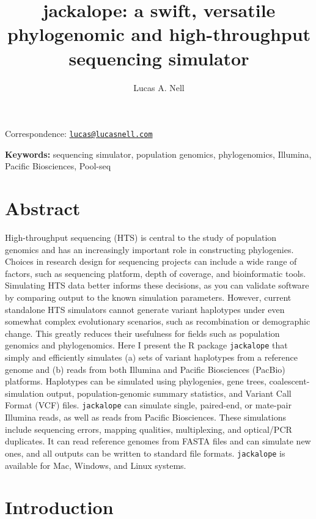 \documentclass[12pt,]{article}
\title{
    jackalope: a swift, versatile phylogenomic and high-throughput sequencing simulator
            }
\author[1]{Lucas A. Nell}
\affil[1]{Department of Integrative Biology, University of Wisconsin, Madison, WI, USA}
\date{}
\makeatletter
\def\maketitle{{%
  \renewenvironment{tabular}[2][]
    {\begin{flushleft}}
    {\end{flushleft}}
  \AB@maketitle}}
\makeatother
\begin{document}
            \maketitle

    Correspondence: \href{mailto:lucas@lucasnell.com}{\nolinkurl{lucas@lucasnell.com}}



\raggedright

\textbf{Keywords:} sequencing simulator, population genomics, phylogenomics,
Illumina, Pacific Biosciences, Pool-seq

\clearpage

\section*{Abstract}

High-throughput sequencing (HTS) is central to the study of population genomics
and has an increasingly important role in constructing phylogenies.
Choices in research design for sequencing projects can include
a wide range of factors, such as sequencing platform, depth of coverage, and
bioinformatic tools.
Simulating HTS data better informs these decisions, as you can validate software by
comparing output to the known simulation parameters.
However, current standalone HTS simulators cannot generate variant haplotypes under
even somewhat complex evolutionary scenarios, such as recombination or demographic change.
This greatly reduces their usefulness
for fields such as population genomics and phylogenomics.
Here I present the R package \texttt{jackalope} that simply and efficiently simulates
(a) sets of variant haplotypes from a reference genome and
(b) reads from both Illumina and Pacific Biosciences (PacBio) platforms.
Haplotypes can be simulated using phylogenies, gene trees,
coalescent-simulation output, population-genomic summary statistics,
and Variant Call Format (VCF) files.
\texttt{jackalope} can simulate single, paired-end, or mate-pair Illumina reads,
as well as reads from Pacific Biosciences.
These simulations include sequencing errors, mapping qualities, multiplexing,
and optical/PCR duplicates.
It can read reference genomes from FASTA files and can simulate new ones,
and all outputs can be written to standard file formats.
\texttt{jackalope} is available for Mac, Windows, and Linux systems.

\hypertarget{introduction}{%
\section{Introduction}\label{introduction}}
\end{document}
